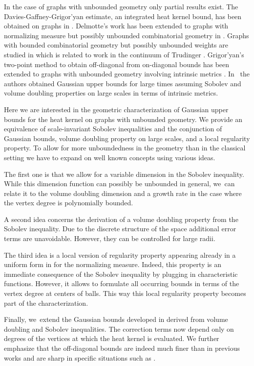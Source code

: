 \documentclass[10pt]{amsart}
\theoremstyle{plain}
\theoremstyle{definition}
\begin{document}
In the case of graphs with unbounded geometry only partial results exist. The Davies-Gaffney-Grigor'yan estimate, an integrated heat kernel bound, has been obtained on graphs in \cite{BauerHuaYau-17}. Delmotte's work has been extended to graphs with normalizing measure but possibly unbounded combinatorial geometry in \cite{BarlowChen-16}. Graphs with bounded combinatorial geometry but possibly unbounded weights are studied in \cite{AndresDS-16,Bella-22} which is related to work in the continuum of Trudinger \cite{Trudinger-71}. Grigor'yan's two-point method to obtain off-diagonal from on-diagonal bounds has been extended to graphs with unbounded geometry involving intrinsic metrics \cite{Folz-11}. In~\cite{KellerRose-22b,KellerRose-22a} the authors obtained Gaussian upper bounds for large times assuming Sobolev and volume doubling properties on large scales in terms of intrinsic metrics.

Here we are interested in the geometric characterization of Gaussian upper bounds for the heat kernel on graphs with unbounded geometry.
We provide an equivalence of scale-invariant
Sobolev inequalities and the conjunction of Gaussian bounds, volume doubling property on large scales, and a local regularity property.
To allow for more unboundedness in the geometry than in the classical setting we have to expand on well known concepts using various ideas.

The first one is that we allow for a variable dimension in the Sobolev inequality. While this dimension function can possibly be unbounded in general, we~can relate it to the volume doubling dimension and a growth rate in the case where the vertex degree is polynomially bounded.

A second idea concerns the derivation of a volume doubling property from the Sobolev inequality. Due to the discrete structure of the space additional error terms are unavoidable. However, they can be controlled for large radii.

The third idea is a local version of regularity property appearing already in a uniform form in \cite{BarlowChen-16} for the normalizing measure. Indeed, this property is an immediate consequence of the Sobolev inequality by plugging in characteristic functions. However, it allows to formulate all occurring bounds in terms of the vertex degree at centers of balls. This way this local regularity property becomes part of the characterization.

Finally, we~extend the Gaussian bounds developed in \cite{KellerRose-22a} derived from volume doubling and Sobolev inequalities. The correction terms now depend only on degrees of the vertices at which the heat kernel is evaluated. We further emphasize that the off-diagonal bounds are indeed much finer than in previous works and are sharp in specific situations such as \cite{Davies-93,Pang-93}.
\end{document}
